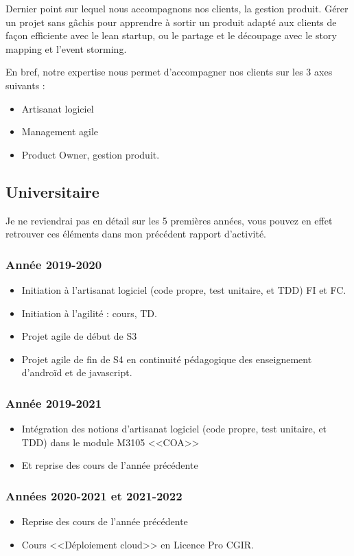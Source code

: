 \documentclass[a4paper]{article}
\begin{document}
Dernier point sur lequel nous accompagnons nos clients, la gestion produit. Gérer un projet sans gâchis pour apprendre à sortir un produit adapté aux clients de façon efficiente avec le lean startup, ou le partage et le découpage avec le story mapping et l'event storming.

En bref, notre expertise nous permet d'accompagner nos clients sur les 3 axes suivants :
\begin{itemize}
  \item Artisanat logiciel
  \item Management agile
  \item Product Owner, gestion produit.
\end{itemize}

\subsection{Universitaire}

Je ne reviendrai pas en détail sur les 5 premières années, vous pouvez en effet retrouver ces éléments dans mon précédent rapport d'activité.

\subsubsection{Année 2019-2020}
\begin{itemize}
  \item Initiation à l'artisanat logiciel (code propre, test unitaire, et TDD) FI et FC.
  \item Initiation à l'agilité : cours, TD.
  \item Projet agile de début de S3
  \item Projet agile de fin de S4 en continuité pédagogique des enseignement d'androïd et de javascript.
\end{itemize}

\subsubsection{Année 2019-2021}
\begin{itemize}
    \item Intégration des notions d'artisanat logiciel (code propre, test unitaire, et TDD) dans le module M3105 <<COA>>
    \item Et reprise des cours de l'année précédente
\end{itemize}

\subsubsection{Années 2020-2021 et 2021-2022}
\begin{itemize}
    \item Reprise des cours de l'année précédente
    \item Cours <<Déploiement cloud>> en Licence Pro CGIR.
\end{itemize}
\end{document}
